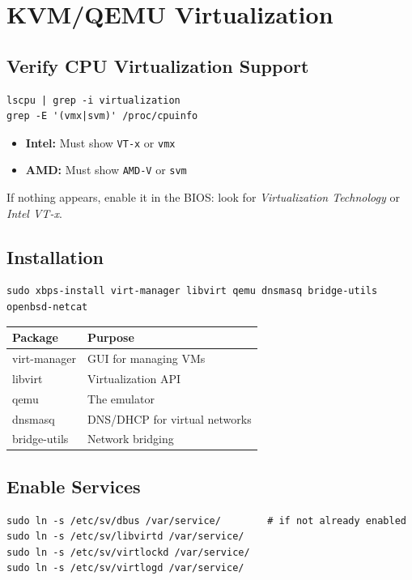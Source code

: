 \documentclass[12pt, a4paper]{book}
\begin{document}
\chapter{KVM/QEMU Virtualization}

\section{Verify CPU Virtualization Support}
\begin{lstlisting}
lscpu | grep -i virtualization
grep -E '(vmx|svm)' /proc/cpuinfo
\end{lstlisting}

\begin{itemize}[leftmargin=*]
  \item \textbf{Intel:} Must show \texttt{VT-x} or \texttt{vmx}
  \item \textbf{AMD:} Must show \texttt{AMD-V} or \texttt{svm}
\end{itemize}

If nothing appears, enable it in the BIOS: look for \textit{Virtualization Technology} or \textit{Intel VT-x}.

\section{Installation}
\begin{lstlisting}
sudo xbps-install virt-manager libvirt qemu dnsmasq bridge-utils openbsd-netcat
\end{lstlisting}

\begin{center}
\begin{tabularx}{0.85\textwidth}{lL}
\toprule
\textbf{Package} & \textbf{Purpose} \\
\midrule
virt-manager  & GUI for managing VMs \\
libvirt       & Virtualization API \\
qemu          & The emulator \\
dnsmasq       & DNS/DHCP for virtual networks \\
bridge-utils  & Network bridging \\
\bottomrule
\end{tabularx}
\end{center}

\section{Enable Services}
\begin{lstlisting}
sudo ln -s /etc/sv/dbus /var/service/        # if not already enabled
sudo ln -s /etc/sv/libvirtd /var/service/
sudo ln -s /etc/sv/virtlockd /var/service/
sudo ln -s /etc/sv/virtlogd /var/service/
\end{lstlisting}
\end{document}
